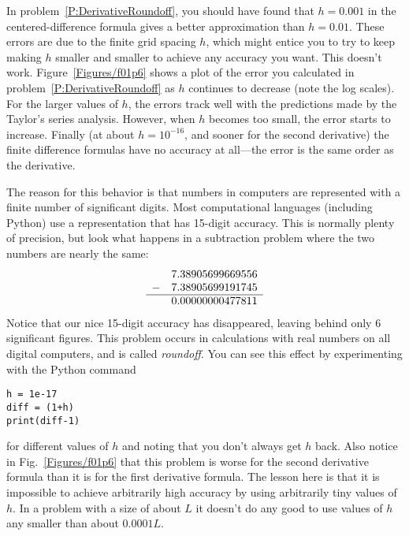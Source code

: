 In problem~\ref{P:DerivativeRoundoff}, you should have found that
$h=0.001$ in the centered-difference formula gives a better
approximation than $h=0.01$.  These errors are due to the finite
grid spacing $h$, which might entice you to try to keep making $h$
smaller and smaller to achieve any accuracy you want. This doesn't
work. Figure~\ref{Figures/f01p6} shows a plot of the error you calculated
in problem~\ref{P:DerivativeRoundoff} as $h$ continues to decrease
(note the log scales). For the larger values of $h$, the errors
track well with the predictions made by the Taylor's series
analysis. However, when $h$ becomes too small, the error starts to
increase. Finally (at about $h=10^{-16}$, and sooner for the second
derivative) the finite difference formulas have no accuracy at
all---the error is the same order as the derivative.

The reason for this behavior is that numbers in computers are
represented with a finite number of significant digits.  Most
computational languages (including Python) use a representation that
has 15-digit accuracy. This is normally plenty of precision, but look
what happens in a subtraction problem where the two numbers are
nearly the same:
\begin{equation}
    \begin{array}{ll}
    & 7.38905699669556 \\
    - & 7.38905699191745 \\
    \hline
    &  0.00000000477811
    \end{array}
\end{equation}
Notice that our nice 15-digit accuracy has disappeared, leaving
behind only 6 significant figures. This problem occurs in
calculations with real numbers on all digital computers, and is
called {\it roundoff}.  You can see this effect by
experimenting with the Python command
\begin{Verbatim}
h = 1e-17
diff = (1+h)
print(diff-1)
\end{Verbatim}
for different values of $h$ and noting that you don't always get
$h$ back. Also notice in Fig.~\ref{Figures/f01p6} that this problem is
worse for the second derivative formula than it is for the first
derivative formula. The lesson here is that it is impossible to
achieve arbitrarily high accuracy by using arbitrarily tiny values
of $h$. In a problem with a size of about $L$ it doesn't do any
good to use values of $h$ any smaller than about $0.0001 L$.


